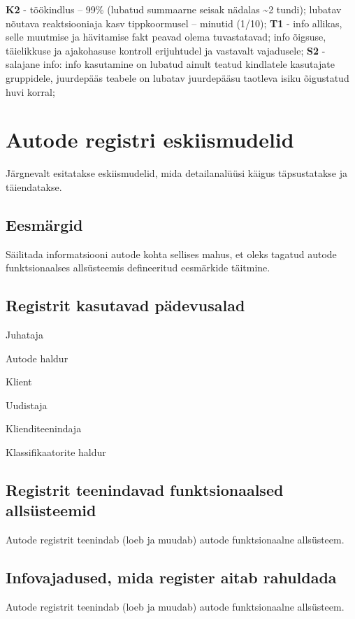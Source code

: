 \begin{longtabu}
	\textbf{K2} - töökindlus – 99\%  (lubatud summaarne seisak nädalas \textasciitilde2 tundi); lubatav nõutava reaktsiooniaja kasv tippkoormusel – minutid (1/10);
	\textbf{T1} -  info allikas, selle muutmise ja hävitamise fakt peavad olema tuvastatavad; info õigsuse, täielikkuse ja ajakohasuse kontroll erijuhtudel ja vastavalt vajadusele;
	\textbf{S2} - salajane info: info kasutamine on lubatud ainult teatud kindlatele kasutajate gruppidele, juurdepääs teabele on lubatav juurdepääsu taotleva isiku õigustatud huvi korral;
	\\ \hline	
\end{longtabu}

\section{Autode registri eskiismudelid }
Järgnevalt esitatakse eskiismudelid, mida detailanalüüsi käigus täpsustatakse ja täiendatakse.

\subsection{Eesmärgid}
Säilitada informatsiooni autode kohta sellises mahus, et oleks tagatud autode funktsionaalses allsüsteemis defineeritud eesmärkide täitmine.

\subsection{Registrit kasutavad pädevusalad}
\begin{myitemize}
	\item Juhataja
	\item Autode haldur
	\item Klient
	\item Uudistaja
	\item Klienditeenindaja
	\item Klassifikaatorite haldur
\end{myitemize}

\subsection{Registrit teenindavad funktsionaalsed allsüsteemid}
Autode registrit teenindab (loeb ja muudab) autode funktsionaalne allsüsteem.

\subsection{Infovajadused, mida register aitab rahuldada}
Autode registrit teenindab (loeb ja muudab) autode funktsionaalne allsüsteem.

